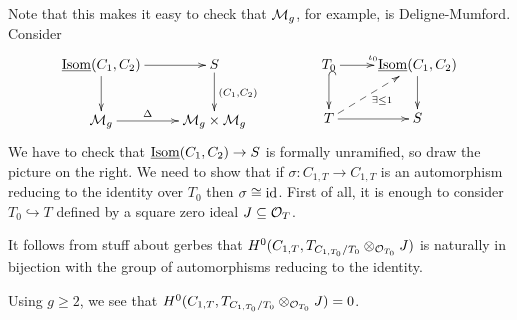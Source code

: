  Note that this makes it easy to check that $\mathcal{M}_g$, for example, is Deligne-Mumford.
 Consider
 \[\xymatrix{
    \isom(C_1,C_2)\ar[r]\ar[d] & S\ar[d]^{(C_1,C_2)}\\
    \M_g \ar[r]^<>(.5)\Delta & \M_g\times\M_g
 }\qquad\qquad
 \xymatrix{
    T_0\ar[r]^{\iota_0}\ar@{^(->}[d] & \isom(C_1,C_2)\ar[d]\\
    T\ar[r]\ar@{-->}[ur]_{\exists\le 1} & S
 }\]
   We have to check that $\operatorname{\underline{Isom}}(C_1,C_2)\to S$ is formally
 unramified, so draw the picture on the right. We need to show that if $\sigma:C_{1,T}\to
 C_{1,T}$ is an automorphism reducing to the identity over $T_0$ then $\sigma\cong \operatorname{id}$.
 First of all, it is enough to consider $T_0\hookrightarrow T$ defined by a square zero
 ideal $J\subseteq \mathcal{O}_T$.

 It follows from stuff about gerbes that $H^0(C_{1,T},T_{C_{1,T_0}/T_0}\otimes_{\mathcal{O}_{T_0}}
 J)$ is naturally in bijection with the group of automorphisms reducing to the identity. 

 Using $g\ge 2$, we see that $H^0(C_{1,T},T_{C_{1,T_0}/T_0}\otimes_{\mathcal{O}_{T_0}} J)=0$. 

